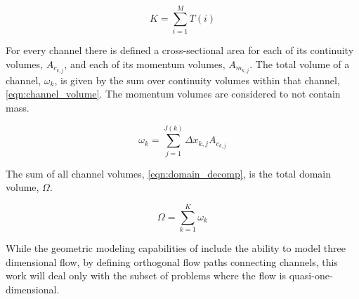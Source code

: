 \begin{equation}
\label{eqn:number_of_channels}
K = \sum_{i = 1}^{M} T(i)
\end{equation}

For every channel there is defined a cross-sectional area for each of its continuity volumes, $A_{c_{k,j}}$, and each of its momentum volumes, $A_{m_{k,j}}$.
The total volume of a channel, $\omega_k$, is given by the sum over continuity volumes within that channel, \eqref{eqn:channel_volume}.
The momentum volumes are considered to not contain mass.

\begin{equation}
\label{eqn:channel_volume}
\omega_k = \sum_{j = 1}^{J(k)} \Delta x_{k,j} A_{c_{k,j}}
\end{equation}

The sum of all channel volumes, \eqref{eqn:domain_decomp}, is the total domain volume, $\Omega$.

\begin{equation}
\label{eqn:domain_decomp}
\Omega = \sum_{k = 1}^{K} \omega_{k}
\end{equation}

While the geometric modeling capabilities of \cobra{} include the ability to model three dimensional flow, by defining orthogonal flow paths connecting channels, this work will deal only with the subset of problems where the flow is quasi-one-dimensional.

